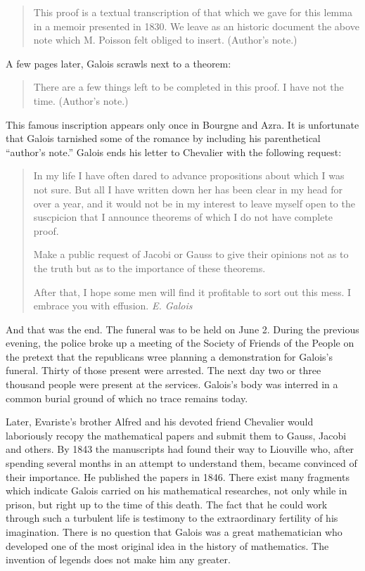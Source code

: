 \documentclass[12pt]{article}
\begin{document}
\begin{quote}
This proof is a textual transcription of that which we gave for this lemma in a memoir presented in 1830. We leave as an historic document the above note which M. Poisson felt obliged to insert. (Author's note.)
\end{quote}
A few pages later, Galois scrawls next to a theorem:

\begin{quote}
There are a few things left to be completed in this proof. I have not the time. (Author's note.)
\end{quote}
This famous inscription appears only once in Bourgne and Azra. It is unfortunate that Galois tarnished some of the romance by including his parenthetical ``author's note.'' Galois ends his letter to Chevalier with the following request:

\begin{quotation}

In my life I have often dared to advance propositions about which I was not sure. But all I have written down her has been clear in my head for over a year, and it would not be in my interest to leave myself open to the suscpicion that I announce theorems of which I do not have complete proof. 

Make a public request of Jacobi or Gauss to give their opinions not as to the truth but as to the importance of these theorems. 

After that, I hope some men will find it profitable to sort out this mess. 
I embrace you with effusion. {\it E. Galois}
\end{quotation}
And that was the end. The funeral was to be held on June 2. During the previous evening, the police broke up a meeting of the Society of Friends of the People on the pretext that the republicans wree planning a demonstration for Galois's funeral. Thirty of those present were arrested. The next day two or three thousand people were present at the services. Galois's body was interred in a common burial ground of which no trace remains today.

Later, Evariste's brother Alfred and his devoted friend Chevalier would laboriously recopy the mathematical papers and submit them to Gauss, Jacobi and others. By 1843 the manuscripts had found their way to Liouville who, after spending several months in an attempt to understand them, became convinced of their importance. He published the papers in 1846. There exist many fragments which indicate Galois carried on his mathematical researches, not only while in prison, but right up to the time of this death. The fact that he could work through such a turbulent life is testimony to the extraordinary fertility of his imagination. There is no question that Galois was a great mathematician who developed one of the most original idea in the history of mathematics. The invention of legends does not make him any greater.
\end{document}

